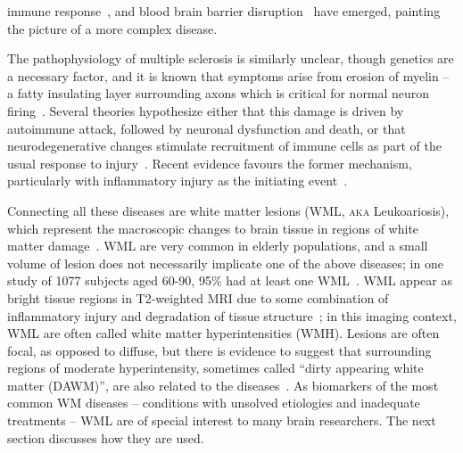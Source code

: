 immune response~\cite{Heppner2015},
and blood brain barrier disruption~\cite{Bell2009} have emerged,
painting the picture of a more complex disease.
\par
The pathophysiology of multiple sclerosis is similarly unclear,
though genetics are a necessary factor, and it is known that symptoms arise from erosion of myelin
-- a fatty insulating layer surrounding axons
which is critical for normal neuron firing~\cite{Trapp2008}.
Several theories hypothesize either that this damage is driven by
autoimmune attack, followed by neuronal dysfunction and death,
or that neurodegenerative changes stimulate recruitment of immune cells
as part of the usual response to injury~\cite{Trapp2008,Lucchinetti2000}.
Recent evidence favours the former mechanism,
particularly with inflammatory injury as the initiating event~\cite{Ciccarelli2014,Mahad2015}.
\par
Connecting all these diseases are white matter lesions (WML, \textsc{aka} Leukoariosis),
which represent the macroscopic changes to brain tissue
in regions of white matter damage~\cite{Debette2010,Bakshi2005,Wardlaw2015}.
WML are very common in elderly populations,
and a small volume of lesion does not necessarily implicate one of the above diseases;
in one study of 1077 subjects aged 60-90, 95\% had at least one WML~\cite{DeLeeuw2001}.
WML appear as bright tissue regions in T2-weighted MRI due to some combination of
inflammatory injury and degradation of tissue structure~\cite{Bakshi2005,Wardlaw2015};
in this imaging context, WML are often called white matter hyperintensities (WMH).
Lesions are often focal, as opposed to diffuse, but there is evidence to suggest that
surrounding regions of moderate hyperintensity,
sometimes called ``dirty appearing white matter (DAWM)'',
are also related to the diseases~\cite{Ge2003}.
As biomarkers of the most common WM diseases
-- conditions with unsolved etiologies and inadequate treatments --
WML are of special interest to many brain researchers.
The next section discusses how they are used.
